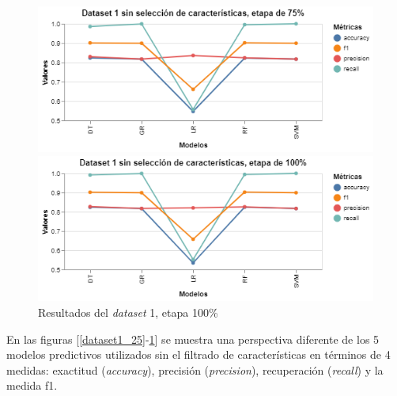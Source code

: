 \newpage
\begin{figure}[htbp]
    \centering
    \begin{minipage}[t]{0.50\textwidth}
        \centering
        \includegraphics[width = \textwidth]{Graphics/dataset_1_75.png}
        \caption{Resultados del \textit{dataset} 1, etapa 75\%}
        \label{dataset1_75}
    \end{minipage}\hfill
    \begin{minipage}[t]{0.50\textwidth}
        \centering
        \includegraphics[width = \textwidth]{Graphics/datatset_1_100.png}
        \caption{Resultados del \textit{dataset} 1, etapa 100\%}
        \label{dataset1_100}
    \end{minipage}
\end{figure}  

En las figuras [\ref{dataset1_25}-\ref{dataset1_100}] se muestra una perspectiva diferente de los 5 modelos predictivos utilizados sin el filtrado de características
en términos de 4 medidas: exactitud (\textit{accuracy}), precisión (\textit{precision}), recuperación (\textit{recall}) y la medida f1.   

